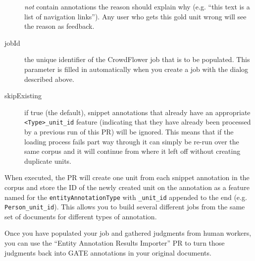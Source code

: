 \begin{description}
  \emph{not} contain annotations the reason should explain why (e.g. ``this
  text is a list of navigation links'').  Any user who gets this gold unit
  wrong will see the reason as feedback.
\item[jobId] the unique identifier of the CrowdFlower job that is to be
  populated.  This parameter is filled in automatically when you create a job
  with the dialog described above.
\item[skipExisting] if true (the default), snippet annotations that already have
  an appropriate \verb!<Type>_unit_id! feature (indicating that they have
  already been processed by a previous run of this PR) will be ignored.  This
  means that if the loading process fails part way through it can simply be
  re-run over the same corpus and it will continue from where it left off
  without creating duplicate units.
\end{description}

When executed, the PR will create one unit from each snippet annotation in the
corpus and store the ID of the newly created unit on the annotation as a
feature named for the \verb!entityAnnotationType! with \verb!_unit_id! appended
to the end (e.g. \verb!Person_unit_id!).  This allows you to build several
different jobs from the same set of documents for different types of
annotation.


Once you have populated your job and gathered judgments from human workers, you
can use the ``Entity Annotation Results Importer'' PR to turn those
judgments back into GATE annotations in your original documents.

